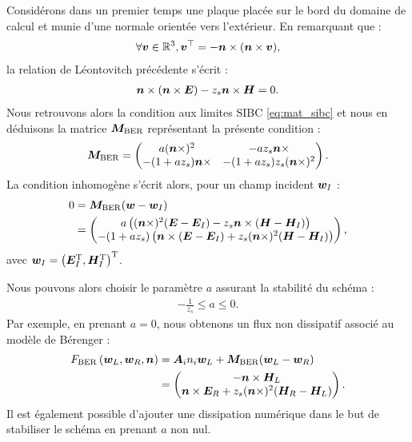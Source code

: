 Considérons dans un premier temps une plaque placée sur le bord
du domaine de calcul et munie d’une normale orientée vers l’extérieur.
En remarquant que :
\begin{align}
	\forall \bm{v} \in \mathbb{R}^{3} , \bm{v}^\top =
	- \bm{n} \times (\bm{n} \times \bm{v}) ,
\end{align}
la relation de Léontovitch précédente s'écrit :
\begin{align}
	\bm{n} \times (\bm{n} \times \bm{E}) - z_s \bm{n} \times \bm{H} = 0 .
\end{align}
Nous retrouvons alors la condition aux limites SIBC \eqref{eq:mat_sibc}
et nous en déduisons la matrice $\bm{M}_{\mathrm{BER}}$
représentant la présente condition :
\begin{align}
	\bm{M}_{\mathrm{BER}} =
	\begin{pmatrix}
		a (\bm{n} \times)^2 & - a z_s \bm{n} \times \\
		- (1 + a z_s) \bm{n} \times & - (1 + a z_s) z_s (\bm{n} \times)^2
	\end{pmatrix} .
\end{align}
La condition inhomogène s’écrit alors, pour un champ incident $\bm{w}_I$ :
\begin{equation}
	\begin{aligned}
		0 &= \bm{M}_{\mathrm{BER}} (\bm{w} - \bm{w}_I) \\
		&= \begin{pmatrix}
			a \left( (\bm{n} \times)^2 (\bm{E} - \bm{E}_I)
				- z_s \bm{n} \times (\bm{H} - \bm{H}_I) \right) \\
			- (1 + a z_s) \left( \bm{n} \times (\bm{E} - \bm{E}_I)
				+ z_s (\bm{n} \times)^2 (\bm{H} - \bm{H}_I) \right)
		\end{pmatrix} ,
	\end{aligned}
\end{equation}
avec
$\bm{w}_I = \left( \bm{E}_I^{\mathrm{T}}, \bm{H}_I^{\mathrm{T}} \right)^{\mathrm{T}}$.

Nous pouvons alors choisir le paramètre $a$ assurant la stabilité du
schéma :
\begin{align}
	- \frac{1}{z_s} \le a \le 0 .
\end{align}
Par exemple, en prenant $a = 0$, nous obtenons un flux non
dissipatif associé au modèle de Bérenger :
\begin{equation}
	\begin{aligned}
	F_\mathrm{BER}\left(\bm{w}_L,\bm{w}_R,\bm{n}\right) &=
		{\bm{A}_{i}n_{i}} \bm{w}_L + \bm{M}_{\mathrm{BER}} (\bm{w}_L - \bm{w}_R) \\
		&= \begin{pmatrix}
			- \bm{n} \times \bm{H}_L \\
			\bm{n} \times \bm{E}_R + z_s (\bm{n} \times)^2 (\bm{H}_R - \bm{H}_L)
		\end{pmatrix}.
	\end{aligned}
\end{equation}
Il est également possible d’ajouter une dissipation numérique dans le but de
stabiliser le schéma en prenant $a$ non nul.
\\

